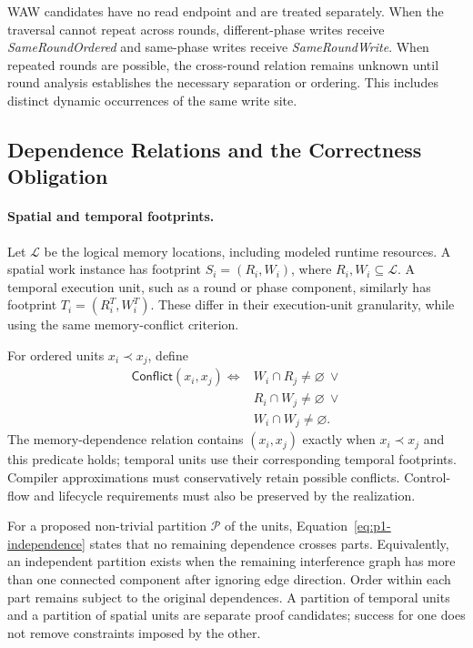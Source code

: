 WAW candidates have no read endpoint and are treated separately. When
the traversal cannot repeat across rounds, different-phase writes receive
\emph{SameRoundOrdered} and same-phase writes receive
\emph{SameRoundWrite}. When repeated rounds are possible, the cross-round
relation remains unknown until round analysis establishes the necessary
separation or ordering. This includes distinct dynamic occurrences of
the same write site.

\subsection{Dependence Relations and the Correctness Obligation}
\label{app:p1-independence}
\paragraph{Spatial and temporal footprints.}
Let $\mathcal L$ be the logical memory locations, including modeled
runtime resources. A spatial work instance has footprint
$S_i=(R_i,W_i)$, where $R_i,W_i\subseteq\mathcal L$.
A temporal execution unit, such as a round or phase component, similarly
has footprint $T_i=(R_i^T,W_i^T)$. These differ in their execution-unit
granularity, while using the same memory-conflict criterion.

For ordered units $x_i\prec x_j$, define
\[
\begin{split}
\mathsf{Conflict}(x_i,x_j)\iff{}&
W_i\cap R_j\ne\varnothing\ \lor\\
&R_i\cap W_j\ne\varnothing\ \lor\\
&W_i\cap W_j\ne\varnothing.
\end{split}
\]
The memory-dependence relation contains $(x_i,x_j)$ exactly when
$x_i\prec x_j$ and this predicate holds; temporal units use their
corresponding temporal footprints. Compiler approximations must
conservatively retain possible conflicts. Control-flow and lifecycle
requirements must also be preserved by the realization.

For a proposed non-trivial partition $\mathcal P$ of the units,
Equation~\ref{eq:p1-independence} states that no remaining dependence
crosses parts. Equivalently, an independent partition exists when the
remaining interference graph has more than one connected component
after ignoring edge direction. Order within each part remains subject
to the original dependences. A partition of temporal units and a
partition of spatial units are separate proof candidates; success for
one does not remove constraints imposed by the other.

